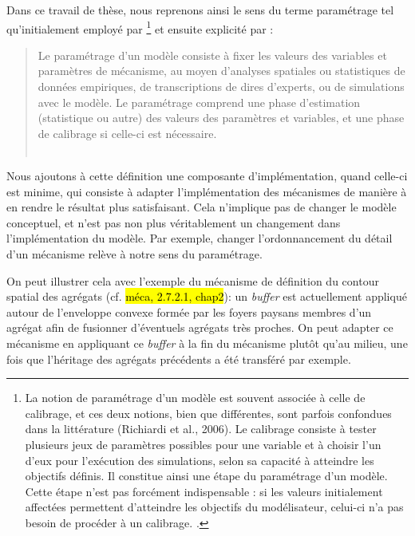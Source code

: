 
Dans ce travail de thèse, nous reprenons ainsi le sens du terme paramétrage tel qu'initialement employé par \textcite{hirtzel2015exploration}\footnote{
	\og
	La notion de paramétrage d'un modèle est souvent associée à celle de calibrage, et ces deux notions, bien que différentes, sont parfois confondues dans la littérature (Richiardi et al., 2006).
	Le calibrage consiste à tester plusieurs jeux de paramètres possibles pour une variable et à choisir l'un d'eux pour l'exécution des simulations, selon sa capacité à atteindre les objectifs définis.
	Il constitue ainsi une étape du paramétrage d'un modèle.
	Cette étape n'est pas forcément indispensable : si les valeurs initialement affectées permettent d'atteindre les objectifs du modélisateur, celui-ci n'a pas besoin de procéder à un calibrage.\fg{} \autocite[136]{hirtzel2015exploration}.
} et ensuite explicité par \textcite{tannier_analyse_2017} :
\begin{quotation}
\noindent \og 
Le paramétrage d'un modèle consiste à fixer les valeurs des variables et paramètres de mécanisme, au moyen d'analyses spatiales ou statistiques de données empiriques, de transcriptions de dires d'experts, ou de simulations avec le modèle.
Le paramétrage comprend une phase d'estimation (statistique ou autre) des valeurs des paramètres et variables, et une phase de calibrage si celle-ci est nécessaire.
\fg{}\\
\mbox{}~ \hfill \textcite[52]{tannier_analyse_2017}
\end{quotation}

Nous ajoutons à cette définition une composante d'implémentation, quand celle-ci est minime, qui consiste à adapter l'implémentation des mécanismes de manière à en rendre le résultat plus satisfaisant.
Cela n'implique pas de changer le modèle conceptuel, et n'est pas non plus véritablement un changement dans l'implémentation du modèle.
Par exemple, changer l'ordonnancement du détail d'un mécanisme relève à notre sens du paramétrage.

On peut illustrer cela avec l'exemple du mécanisme de définition du contour spatial des agrégats (cf. \hl{méca, 2.7.2.1, chap2}): un \textit{buffer} est actuellement appliqué autour de l'enveloppe convexe formée par les foyers paysans membres d'un agrégat afin de fusionner d'éventuels agrégats très proches.
On peut adapter ce mécanisme en appliquant ce \textit{buffer} à la fin du mécanisme plutôt qu'au milieu, une fois que l'héritage des agrégats précédents a été transféré par exemple.


